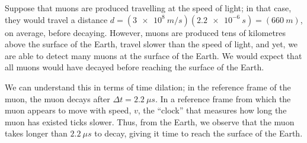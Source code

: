 Suppose that muons are produced travelling at the speed of light; in that case, they would travel a distance $d=(\SI{3e8}{m/s})(\SI{2.2e-6}{s})=(\SI{660}{m})$, on average, before decaying. However, muons are produced tens of kilometres above the surface of the Earth, travel slower than the speed of light, and yet, we are able to detect many muons at the surface of the Earth. We would expect that all muons would have decayed before reaching the surface of the Earth.

We can understand this in terms of time dilation; in the reference frame of the muon, the muon decays after $\Delta t=\SI{2.2}{\mu s}$. In a reference frame from which the muon appears to move with speed, $v$, the ``clock'' that measures how long the muon has existed ticks slower. Thus, from the Earth, we observe that the muon takes longer than $\SI{2.2}{\mu s}$ to decay, giving it time to reach the surface of the Earth.

